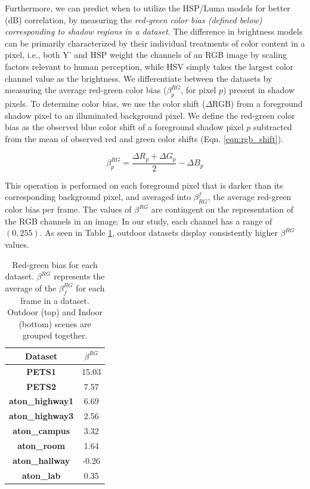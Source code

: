 Furthermore, we can predict when to utilize the HSP/Luma models for better (dB) correlation, by measuring the \textit{red-green color bias (defined below) corresponding to shadow regions in a dataset.} The difference in brightness models can be primarily characterized by their individual treatments of color content in a pixel, i.e., both Y' and HSP weight the channels of an RGB image by scaling factors relevant to human perception, while HSV simply takes the largest color channel value as the brightness. We differentiate between the datasets by measuring the average red-green color bias ($\beta^{RG}_{p}$, for pixel $p$) present in shadow pixels. To determine color bias, we use the color shift ($\Delta$RGB) from a foreground shadow pixel to an illuminated background pixel. We define the red-green color bias as the observed blue color shift of a foreground shadow pixel $p$ subtracted from the mean of observed red and green color shifts (Eqn. \ref{eqn:rgb_shift}).

\begin{equation}
\beta^{RG}_{p} = \dfrac{\Delta R_{p} + \Delta G_{p}}{2} - \Delta B_{p}
\label{eqn:rgb_shift}
\end{equation}

This operation is performed on each foreground pixel that is darker than its corresponding background pixel, and averaged into $\beta^{f}_{RG}$, the average red-green color bias per frame. The values of $\beta^{RG}$ are contingent on the representation of the RGB channels in an image. In our study, each channel has a range of $(0, 255)$. As seen in Table \ref{table:rg_bias}, outdoor datasets display consistently higher $\beta^{RG}$ values.

\begin{table}
\centering
\begin{tabular}{ |c|c| }
	\hline
	\textbf{Dataset} & \textbf{$\beta^{RG}$} \\
	\hline
	\hline
	\textbf{PETS1} & 15.03 \\
	\hline
	\textbf{PETS2} & 7.57 \\
	\hline
	\textbf{aton\_highway1} & 6.69 \\
	\hline
	\textbf{aton\_highway3} & 2.56 \\
	\hline
	\textbf{aton\_campus} & 3.32 \\
	\hline
	\hline
	\textbf{aton\_room} & 1.64 \\
	\hline
	\textbf{aton\_hallway} & -0.26 \\
	\hline
	\textbf{aton\_lab} & 0.35 \\
	\hline
\end{tabular}
\caption{Red-green bias for each dataset. $\beta^{RG}$ represents the average of the $\beta^{RG}_{f}$ for each frame in a dataset. Outdoor (top) and Indoor (bottom) scenes are grouped together.}
\label{table:rg_bias}
\end{table}

